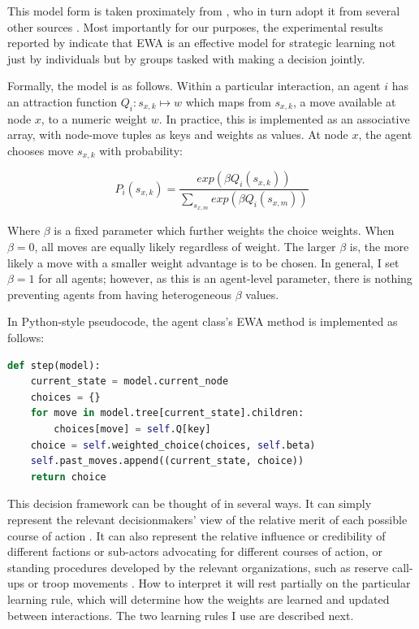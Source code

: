 This model form is taken proximately from \citet{galla_2013}, who in turn adopt it from several other sources \citep{camerer_2002,kocher_2005,ho_2007}. Most importantly for our purposes, the experimental results reported by \citet{kocher_2005} indicate that EWA is an effective model for strategic learning not just by individuals but by groups tasked with making a decision jointly.

Formally, the model is as follows. Within a particular interaction, an agent $i$ has an attraction function $ Q_i : s_{x,k} \mapsto w$ which maps from $s_{x,k}$, a move available at node $x$, to a numeric weight $w$. In practice, this is implemented as an associative array, with node-move tuples as keys and weights as values. At node $x$, the agent chooses move $s_{x,k}$ with probability:

\begin{equation}
    P_i(s_{x,k}) = \frac{exp(\beta Q_i(s_{x,k}))}{\sum_{s_{x,m}}exp(\beta Q_i({s_{x,m}}))}
\end{equation}

Where $\beta$ is a fixed parameter which further weights the choice weights. When $\beta=0$, all moves are equally likely regardless of weight. The larger $\beta$ is, the more likely a move with a smaller weight advantage is to be chosen. In general, I set $\beta=1$ for all agents; however, as this is an agent-level parameter, there is nothing preventing agents from having heterogeneous $\beta$ values.

In Python-style pseudocode, the agent class's EWA method is implemented as follows:

\begin{singlespace}
\begin{lstlisting}[language=python,caption={Experience-Weighted Attraction},label={code:ewa}]
def step(model):
    current_state = model.current_node
    choices = {}
    for move in model.tree[current_state].children:
        choices[move] = self.Q[key]
    choice = self.weighted_choice(choices, self.beta)
    self.past_moves.append((current_state, choice))
    return choice
\end{lstlisting}
\end{singlespace}

This decision framework can be thought of in several ways. It can simply represent the relevant decisionmakers' view of the relative merit of each possible course of action \citep{kocher_2005}. It can also represent the relative influence or credibility of different factions or sub-actors advocating for different courses of action, or standing procedures developed by the relevant organizations, such as reserve call-ups or troop movements \citep{levy_1986}. How to interpret it will rest partially on the particular learning rule, which will determine how the weights are learned and updated between interactions. The two learning rules I use are described next.

